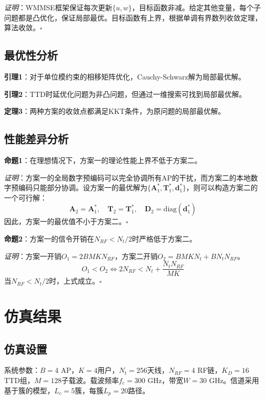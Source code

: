 \documentclass[10pt,twocolumn]{IEEEtran}
\newcommand{\vect}[1]{\mathbf{#1}}
\newcommand{\mat}[1]{\mathbf{#1}}
\begin{document}
\textit{证明}：WMMSE框架保证每次更新$\{u, w\}$，目标函数非减。给定其他变量，每个子问题都是凸优化，保证局部最优。目标函数有上界，根据单调有界数列收敛定理，算法收敛。$\square$

\subsection{最优性分析}

\textbf{引理1}：对于单位模约束的相移矩阵优化，Cauchy-Schwarz解为局部最优解。

\textbf{引理2}：TTD时延优化问题为非凸问题，但通过一维搜索可找到局部最优解。

\textbf{定理3}：两种方案的收敛点都满足KKT条件，为原问题的局部最优解。

\subsection{性能差异分析}

\textbf{命题1}：在理想情况下，方案一的理论性能上界不低于方案二。

\textit{证明}：方案一的全局数字预编码可以完全协调所有AP的干扰，而方案二的本地数字预编码只能部分协调。设方案一的最优解为$\{\mat{A}_1^*, \mat{T}_1^*, \vect{d}_1^*\}$，则可以构造方案二的一个可行解：
\begin{equation}
\mat{A}_2 = \mat{A}_1^*, \quad \mat{T}_2 = \mat{T}_1^*, \quad \mat{D}_2 = \text{diag}(\vect{d}_1^*)
\end{equation}
因此，方案一的最优值不小于方案二。$\square$

\textbf{命题2}：方案一的信令开销在$N_{RF} < N_t/2$时严格低于方案二。

\textit{证明}：方案一开销$O_1 = 2BMK N_{RF}$，方案二开销$O_2 = BMK N_t + BN_t N_{RF}$。
\begin{equation}
O_1 < O_2 \Leftrightarrow 2N_{RF} < N_t + \frac{N_t N_{RF}}{MK}
\end{equation}
当$N_{RF} < N_t/2$时，上式成立。$\square$

\section{仿真结果}

\subsection{仿真设置}

系统参数：$B=4$ AP，$K=4$用户，$N_t=256$天线，$N_{RF}=4$ RF链，$K_D=16$ TTD组，$M=128$子载波。载波频率$f_c=300$ GHz，带宽$W=30$ GHz。信道采用基于簇的模型，$L_c=5$簇，每簇$L_p=20$路径。
\end{document}
